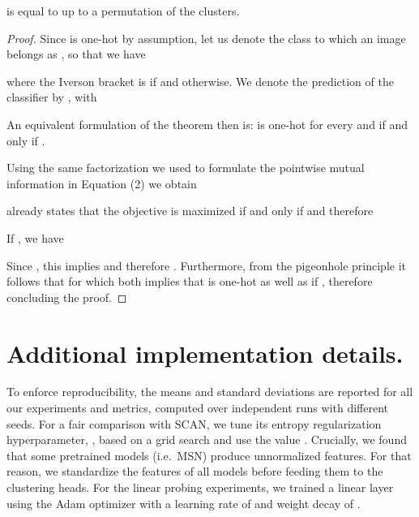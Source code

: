 \documentclass{bmvc2k}
\begin{document}
is equal to  up to a permutation of the clusters.
\begin{proof}
Since  is one-hot by assumption, let us denote the class to which an image  belongs as , so that we have

where the Iverson bracket  is  if  and  otherwise.
We denote the prediction of the classifier by , with

An equivalent formulation of the theorem then is:
 is one-hot for every  and  if and only if .

Using the same factorization we used to formulate the pointwise mutual information in Equation (2) we obtain



 already states that the objective is maximized if and only if 
and therefore


If , we have

Since , this implies
 and therefore
.
Furthermore, from the pigeonhole principle it follows that  for  which both implies that  is one-hot as well as  if , therefore concluding the proof.
\end{proof} 


\section{Additional implementation details.}
To enforce reproducibility, the means and standard deviations are reported for all our experiments and metrics, computed over  independent runs with different seeds. For a fair comparison with SCAN, we tune its entropy regularization hyperparameter, , based on a grid search and use the value . Crucially, we found that some pretrained models (i.e.\ MSN) produce unnormalized features. For that reason, we standardize the features of all models before feeding them to the clustering heads. For the linear probing experiments, we trained a linear layer using the Adam \cite{adam} optimizer with a learning rate of  and weight decay of . 
\end{document}
